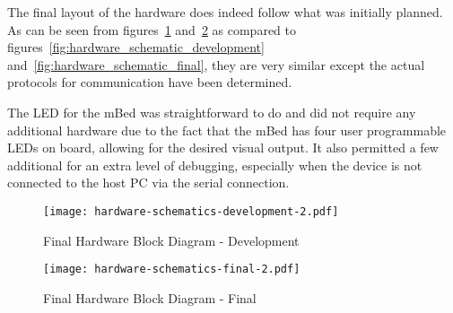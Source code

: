 
The final layout of the hardware does indeed follow what was initially planned. As can be seen from figures~\ref{fig:hardware_schematic_development-2} and~\ref{fig:hardware_schematic_final-2} as compared to figures~\ref{fig:hardware_schematic_development} and~\ref{fig:hardware_schematic_final}, they are very similar except the actual protocols for communication have been determined. 

The LED for the mBed was straightforward to do and did not require any additional hardware due to the fact that the mBed has four user programmable LEDs on board, allowing for the desired visual output. It also permitted a few additional for an extra level of debugging, especially when the device is not connected to the host PC via the serial connection.

\begin{figure}
	\centering
	\texttt{[image: hardware-schematics-development-2.pdf]}
	\caption{Final Hardware Block Diagram - Development}
	\label{fig:hardware_schematic_development-2}
\end{figure}

\begin{figure}
	\centering
	\texttt{[image: hardware-schematics-final-2.pdf]}
	\caption{Final Hardware Block Diagram - Final}
	\label{fig:hardware_schematic_final-2}
\end{figure}